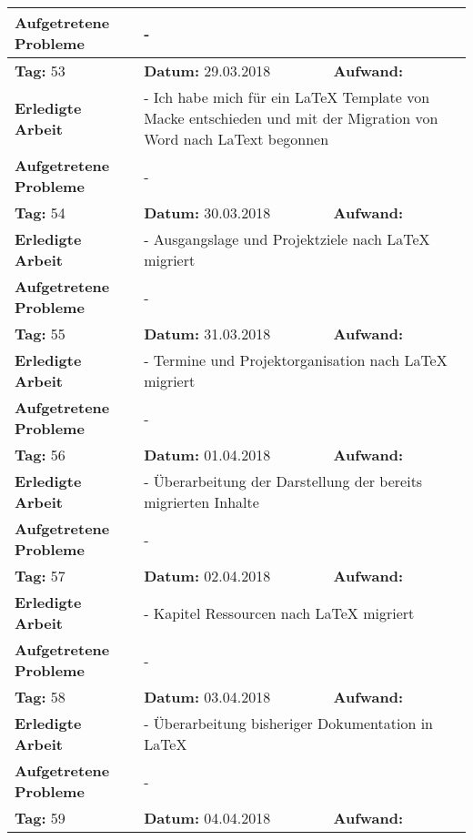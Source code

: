 \begin{longtable}{|p{5cm}|p{5cm}|p{6cm}|}
\textbf{Aufgetretene Probleme} & \multicolumn{2}{p{11cm}|}{-} \\ \hline
\rowcolor{heading}\textbf{Tag:} 53 & \textbf{Datum:} 29.03.2018 & \textbf{Aufwand:} \\ \hline
\textbf{Erledigte Arbeit} & \multicolumn{2}{p{11cm}|}{- Ich habe mich für ein LaTeX Template von Macke entschieden und mit der Migration von Word nach LaText begonnen} \\ \hline
\textbf{Aufgetretene Probleme} & \multicolumn{2}{p{11cm}|}{-} \\ \hline
\rowcolor{heading}\textbf{Tag:} 54 & \textbf{Datum:} 30.03.2018 & \textbf{Aufwand:} \\ \hline
\textbf{Erledigte Arbeit} & \multicolumn{2}{p{11cm}|}{- Ausgangslage und Projektziele nach LaTeX migriert} \\ \hline
\textbf{Aufgetretene Probleme} & \multicolumn{2}{p{11cm}|}{-} \\ \hline\rowcolor{heading}\textbf{Tag:} 55 & \textbf{Datum:} 31.03.2018 & \textbf{Aufwand:} \\ \hline
\textbf{Erledigte Arbeit} & \multicolumn{2}{p{11cm}|}{- Termine und Projektorganisation nach LaTeX migriert} \\ \hline
\textbf{Aufgetretene Probleme} & \multicolumn{2}{p{11cm}|}{-} \\ \hline
\rowcolor{heading}\textbf{Tag:} 56 & \textbf{Datum:} 01.04.2018 & \textbf{Aufwand:} \\ \hline
\textbf{Erledigte Arbeit} & \multicolumn{2}{p{11cm}|}{- Überarbeitung der Darstellung der bereits migrierten Inhalte} \\ \hline
\textbf{Aufgetretene Probleme} & \multicolumn{2}{p{11cm}|}{-} \\ \hline
\rowcolor{heading}\textbf{Tag:} 57 & \textbf{Datum:} 02.04.2018 & \textbf{Aufwand:} \\ \hline
\textbf{Erledigte Arbeit} & \multicolumn{2}{p{11cm}|}{- Kapitel Ressourcen nach LaTeX migriert} \\ \hline
\textbf{Aufgetretene Probleme} & \multicolumn{2}{p{11cm}|}{-} \\ \hline
\rowcolor{heading}\textbf{Tag:} 58 & \textbf{Datum:} 03.04.2018 & \textbf{Aufwand:} \\ \hline
\textbf{Erledigte Arbeit} & \multicolumn{2}{p{11cm}|}{- Überarbeitung bisheriger Dokumentation in LaTeX} \\ \hline
\textbf{Aufgetretene Probleme} & \multicolumn{2}{p{11cm}|}{-} \\ \hline
\rowcolor{heading}\textbf{Tag:} 59 & \textbf{Datum:} 04.04.2018 & \textbf{Aufwand:} \\ \hline

\end{longtable}
